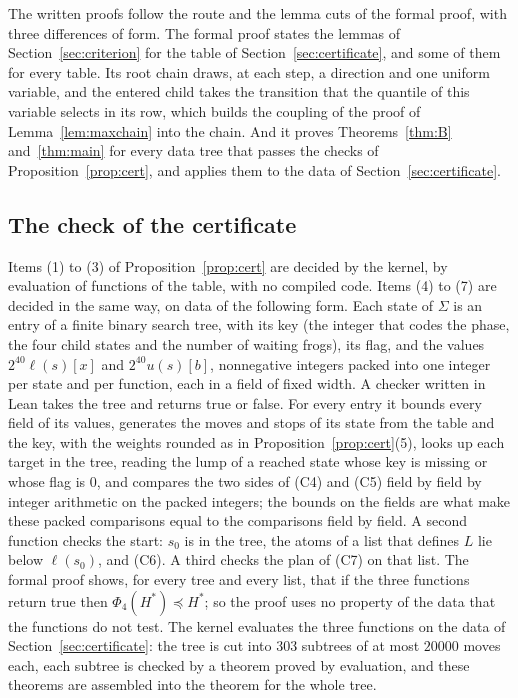 \documentclass[11pt]{amsart}
\theoremstyle{definition}
\numberwithin{equation}{section}
\newcommand{\computed}[1]{\ignorespaces}
\newcommand{\stle}{\preceq}
\begin{document}
The written proofs follow the route and the lemma cuts of the formal proof, with three differences of form. The formal proof states the lemmas of Section~\ref{sec:criterion} for the table of Section~\ref{sec:certificate}, and some of them for every table. Its root chain draws, at each step, a direction and one uniform variable, and the entered child takes the transition that the quantile of this variable selects in its row, which builds the coupling of the proof of Lemma~\ref{lem:maxchain} into the chain. And it proves Theorems~\ref{thm:B} and~\ref{thm:main} for every data tree that passes the checks of Proposition~\ref{prop:cert}, and applies them to the data of Section~\ref{sec:certificate}.

\subsection{The check of the certificate}\label{sec:comp-check}\computed{FrogModel/G3K/Spec.lean, .github/workflows/ci.yml, code/g3k/modules.sha256}
Items (1) to (3) of Proposition~\ref{prop:cert} are decided by the kernel, by evaluation of functions of the table, with no compiled code. Items (4) to (7) are decided in the same way, on data of the following form. Each state of $\Sigma$ is an entry of a finite binary search tree, with its key (the integer that codes the phase, the four child states and the number of waiting frogs), its flag, and the values $2^{40}\ell(s)[x]$ and $2^{40}u(s)[b]$, nonnegative integers packed into one integer per state and per function, each in a field of fixed width. A checker written in Lean takes the tree and returns true or false. For every entry it bounds every field of its values, generates the moves and stops of its state from the table and the key, with the weights rounded as in Proposition~\ref{prop:cert}(5), looks up each target in the tree, reading the lump of a reached state whose key is missing or whose flag is $0$, and compares the two sides of (C4) and (C5) field by field by integer arithmetic on the packed integers; the bounds on the fields are what make these packed comparisons equal to the comparisons field by field. A second function checks the start: $s_0$ is in the tree, the atoms of a list that defines $L$ lie below $\ell(s_0)$, and (C6). A third checks the plan of (C7) on that list. The formal proof shows, for every tree and every list, that if the three functions return true then $\Phi_4(H^*)\stle H^*$; so the proof uses no property of the data that the functions do not test. The kernel evaluates the three functions on the data of Section~\ref{sec:certificate}: the tree is cut into $303$ subtrees of at most $20000$ moves each, each subtree is checked by a theorem proved by evaluation, and these theorems are assembled into the theorem for the whole tree.
\end{document}
